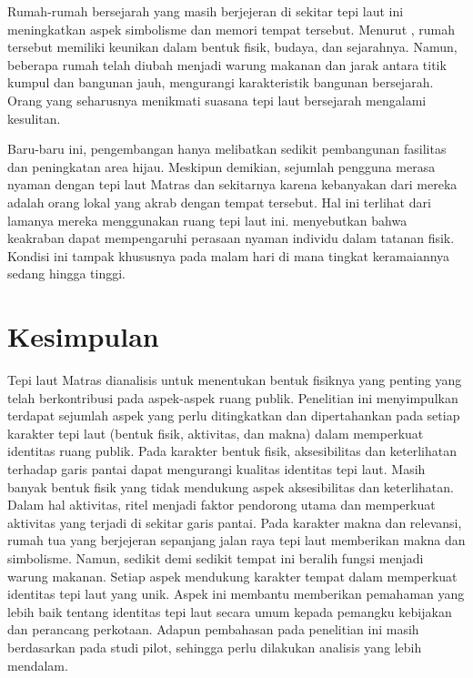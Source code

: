 \documentclass[11pt]{simart} %
\begin{document}
Rumah-rumah bersejarah yang masih berjejeran di sekitar tepi laut ini meningkatkan aspek simbolisme dan memori tempat tersebut. Menurut \cite{iqbal2020}, rumah tersebut memiliki keunikan dalam bentuk fisik, budaya, dan sejarahnya. Namun, beberapa rumah telah diubah menjadi warung makanan dan jarak antara titik kumpul dan bangunan jauh, mengurangi karakteristik bangunan bersejarah. Orang yang seharusnya menikmati suasana tepi laut bersejarah mengalami kesulitan.


Baru-baru ini, pengembangan hanya melibatkan sedikit pembangunan fasilitas dan peningkatan area hijau. Meskipun demikian, sejumlah pengguna merasa nyaman dengan tepi laut Matras dan sekitarnya karena kebanyakan dari mereka adalah orang lokal yang akrab dengan tempat tersebut. Hal ini terlihat dari lamanya mereka menggunakan ruang tepi laut ini. \cite{ujang2017} menyebutkan bahwa keakraban dapat mempengaruhi perasaan nyaman individu dalam tatanan fisik. Kondisi ini tampak khususnya pada malam hari di mana tingkat keramaiannya sedang hingga tinggi.


\section{Kesimpulan}%
\label{sec:Kesimpulan}

Tepi laut Matras dianalisis untuk menentukan bentuk fisiknya yang penting yang telah berkontribusi pada aspek-aspek ruang publik. Penelitian ini menyimpulkan terdapat sejumlah aspek yang perlu ditingkatkan dan dipertahankan pada setiap karakter tepi laut (bentuk fisik, aktivitas, dan makna) dalam memperkuat identitas ruang publik. Pada karakter bentuk fisik, aksesibilitas dan keterlihatan terhadap garis pantai dapat mengurangi kualitas identitas tepi laut. Masih banyak bentuk fisik yang tidak mendukung aspek aksesibilitas dan keterlihatan. Dalam hal aktivitas, ritel menjadi faktor pendorong utama dan memperkuat aktivitas yang terjadi di sekitar garis pantai. Pada karakter makna dan relevansi, rumah tua yang berjejeran sepanjang jalan raya tepi laut memberikan makna dan simbolisme. Namun, sedikit demi sedikit tempat ini beralih fungsi menjadi warung makanan. Setiap aspek mendukung karakter tempat dalam memperkuat identitas tepi laut yang unik. Aspek ini membantu memberikan pemahaman yang lebih baik tentang identitas tepi laut secara umum kepada pemangku kebijakan dan perancang perkotaan. Adapun pembahasan pada penelitian ini masih berdasarkan pada studi pilot, sehingga perlu dilakukan analisis yang lebih mendalam.






% 

\end{document}
